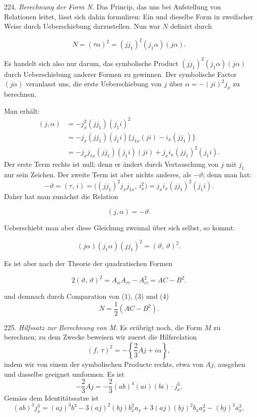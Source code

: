 \documentclass[11pt]{article}
\providecommand{\weberpage}[1]{}
\providecommand{\weq}[2]{\begin{equation}\tag{#1}#2\end{equation}}
\begin{document}
\weberpage{249}

224. \textit{Berechnung der Form N.} Das Princip, das uns bei Aufstellung von Relationen leitet, lässt sich dahin formuliren: Ein und dieselbe Form in zweifacher Weise durch Ueberschiebung darzustellen. Nun war $N$ definirt durch

\weq{1}{N = (\tau\alpha)^2 = (jj_1)^2(j_1\alpha)(j\alpha).}

Es handelt sich also nur darum, das symbolische Product $(jj_1)^2(j_1\alpha)(j\alpha)$ durch Ueberschiebung anderer Formen zu gewinnen. Der symbolische Factor $(j\alpha)$ veranlasst uns, die erste Ueberschiebung von $j$ über $\alpha = -(ji)^2j_x$ zu berechnen.

Man erhält:
\[
\begin{aligned}
(j,\alpha) &= -j_x^2(jj_1)(j_1i)^2\\
&= -j_x(jj_1)(j_1i)\{j_{1x}(ji) - i_x(jj_1)\}\\
&= -j_xj_{1x}(jj_1)(j_1i)(ji) + j_xi_x(jj_1)^2(j_1i).
\end{aligned}
\]
Der erste Term rechts ist null; denn er ändert durch Vertauschung von $j$ mit $j_1$ nur sein Zeichen. Der zweite Term ist aber nichts anderes, als $-\vartheta$; denn man hat:
\[
-\vartheta = (\tau,\,i) = \big((jj_1)^2j_xj_{1x},\,i_x^2\big) = j_xi_x(jj_1)^2(j_1i).
\]
Daher hat man zunächst die Relation

\weq{2}{(j,\alpha) = -\vartheta.}

Ueberschiebt man aber diese Gleichung zweimal über sich selbst, so kommt:

\weq{3}{(j\alpha)(j_1\alpha)(jj_1)^2 = (\vartheta,\,\vartheta)^2.}

Es ist aber nach der Theorie der quadratischen Formen

\weq{4}{2(\vartheta,\,\vartheta)^2 = A_{ii}A_{\tau\tau} - A_{i\tau}^2 = AC - B^2.}

und demnach durch Comparation von (1), (3) und (4)
\[
N = \frac{1}{2}(AC-B^2).
\]

225. \textit{Hilfssatz zur Berechnung von M.} Es erübrigt noch, die Form $M$ zu berechnen; zu dem Zwecke beweisen wir zuerst die Hilfsrelation
\[
(f,\,\tau)^2 = -\left\{\frac{2}{3}Aj + i\alpha\right\},
\]
indem wir von einem der symbolischen Producte rechts, etwa von $Aj$, ausgehen und dasselbe geeignet umformen. Es ist
\[
-\frac{2}{3}Aj = -\frac{2}{3}(ab)^4(ai)(bi)\cdot j_x^3.
\]
Gemäss dem Identitätssatze ist
\[
(ab)^3j_x^3 = (aj)^3b^3 - 3(aj)^2(bj)b_x^2a_x + 3(aj)(bj)^2b_xa_x^2 - (bj)^3a_x^3,
\]
\end{document}
